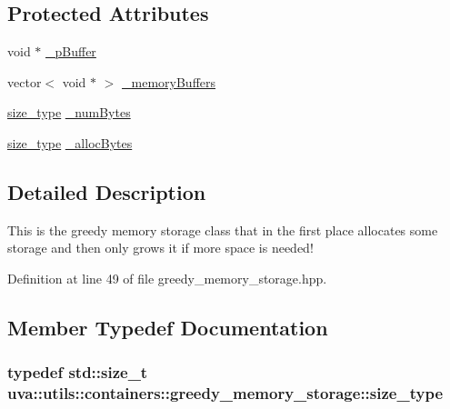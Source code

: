 \subsection*{Protected Attributes}
\begin{DoxyCompactItemize}
\item 
void $\ast$ \hyperlink{classuva_1_1utils_1_1containers_1_1greedy__memory__storage_ade35ae22f918c450a3868f4e96c628ca}{\+\_\+p\+Buffer}
\item 
vector$<$ void $\ast$ $>$ \hyperlink{classuva_1_1utils_1_1containers_1_1greedy__memory__storage_a03e3173b47437840289bc1f433772aaf}{\+\_\+memory\+Buffers}
\item 
\hyperlink{classuva_1_1utils_1_1containers_1_1greedy__memory__storage_a50b3509335bfab9e81ac0ec31b3a21ca}{size\+\_\+type} \hyperlink{classuva_1_1utils_1_1containers_1_1greedy__memory__storage_a78c24bbb9a07f246a1049cf476959510}{\+\_\+num\+Bytes}
\item 
\hyperlink{classuva_1_1utils_1_1containers_1_1greedy__memory__storage_a50b3509335bfab9e81ac0ec31b3a21ca}{size\+\_\+type} \hyperlink{classuva_1_1utils_1_1containers_1_1greedy__memory__storage_af0aa7e312dd1d044d1b303f0017caed5}{\+\_\+alloc\+Bytes}
\end{DoxyCompactItemize}


\subsection{Detailed Description}
This is the greedy memory storage class that in the first place allocates some storage and then only grows it if more space is needed! 

Definition at line 49 of file greedy\+\_\+memory\+\_\+storage.\+hpp.



\subsection{Member Typedef Documentation}
\hypertarget{classuva_1_1utils_1_1containers_1_1greedy__memory__storage_a50b3509335bfab9e81ac0ec31b3a21ca}{}
\subsubsection[{size\+\_\+type}]{\setlength{\rightskip}{0pt plus 5cm}typedef std\+::size\+\_\+t {\bf uva\+::utils\+::containers\+::greedy\+\_\+memory\+\_\+storage\+::size\+\_\+type}}\label{classuva_1_1utils_1_1containers_1_1greedy__memory__storage_a50b3509335bfab9e81ac0ec31b3a21ca}


